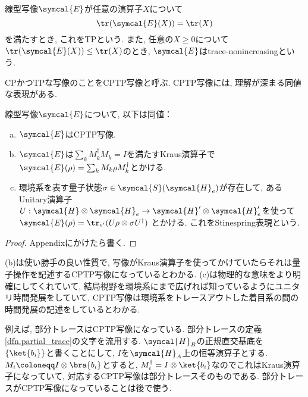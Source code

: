 \begin{mydfn}[TP写像]\label{dfn.TP-map}
  線型写像$\symcal{E}$が任意の演算子$X$について
  \begin{equation}
    \tr(\symcal{E}(X))=\tr(X)
  \end{equation}
  を満たすとき, これをTPという. 
  また, 任意の$X\geq 0$について$\tr(\symcal{E}(X))\leq\tr(X)$のとき, $\symcal{E}$はtrace-nonincreasingという. 
\end{mydfn}

CPかつTPな写像のことをCPTP写像と呼ぶ. 
CPTP写像には, 理解が深まる同値な表現がある. 

\begin{mythm}[CPTP写像の同値な表現]\label{thm.CPTP-map}
  線型写像$\symcal{E}$について, 以下は同値：
  \begin{enumerate}[(a). ]
    \item $\symcal{E}$はCPTP写像. 
    \item $\symcal{E}$は$\sum_{k}M_k^{\dag}M_k=I$を満たすKraus演算子で$\symcal{E}(\rho)=\sum_{k}M_k\rho M_k^{\dag}$とかける. 
    \item 環境系を表す量子状態$\sigma\in\symcal{S}(\symcal{H}_e)$が存在して, あるUnitary演算子$U:\symcal{H}\otimes \symcal{H}_e\to \symcal{H}'\otimes \symcal{H}_e'$を使って
      $\symcal{E}(\rho)=\tr_{e'}(U\rho\otimes\sigma U^{\dag})$
    とかける. 
    これをStinespring表現という. 
  \end{enumerate}
\end{mythm}

\begin{proof}
  Appendixにかけたら書く. 
\end{proof}

(b)は使い勝手の良い性質で, 写像がKraus演算子を使ってかけていたらそれは量子操作を記述するCPTP写像になっているとわかる. 
(c)は物理的な意味をより明確にしてくれていて, 結局視野を環境系にまで広げれば知っているようにユニタリ時間発展をしていて, CPTP写像は環境系をトレースアウトした着目系の間の時間発展の記述をしているとわかる. \\

\begin{e.g.}
  例えば, 部分トレースはCPTP写像になっている. 
  部分トレースの定義\ref{dfn.partial_trace}の文字を流用する. 
  $\symcal{H}_B$の正規直交基底を$\{\ket{b_i}\}$と書くことにして, $I$を$\symcal{H}_A$上の恒等演算子とする. 
  $M_i\coloneqq I\otimes \bra{b_i}$とすると, $M_i^\dag=I\otimes \ket{b_i}$なのでこれはKraus演算子になっていて, 対応するCPTP写像は部分トレースそのものである. 
  部分トレースがCPTP写像になっていることは後で使う. 
\end{e.g.}